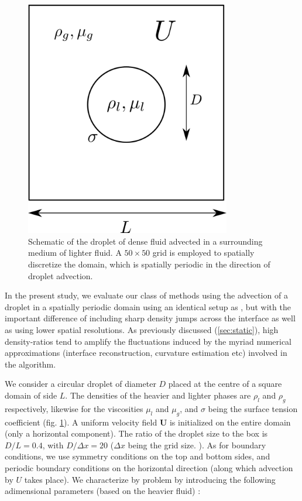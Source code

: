 \begin{figure}[h!]
    \centering
    \includegraphics[width = 0.8\textwidth]{plots/droplet_advect/config.png}
    \caption{Schematic of the droplet of dense fluid advected in a surrounding medium of lighter fluid. A $50 \times 50$ grid is employed to spatially discretize the domain, which is spatially periodic in the direction of droplet advection.}
    \label{moving_conf}
\end{figure}

In the present study, we evaluate our class of methods using the advection of a droplet in a spatially periodic domain using an identical setup as \cite{popinet2009accurate}, but with the important difference of including sharp density jumps across the interface as well as using lower spatial resolutions. As previously discussed (\ref{sec:static}), high density-ratios tend to amplify the fluctuations induced by the myriad numerical approximations (interface reconstruction, curvature estimation etc) involved in the algorithm.

We consider a circular droplet of diameter $D$ placed at the centre of a square domain of side $L$. The densities of the heavier and lighter phases are $\rho_l$ and $\rho_g$ respectively, likewise for the viscosities $\mu_l$ and $\mu_g$, and $\sigma$ being the surface tension coefficient (fig. \ref{moving_conf}). A uniform velocity field $\boldsymbol{U}$ is initialized on the entire domain (only a horizontal component). The ratio of the droplet size to the box is $D/L = 0.4$, with $D/\Delta x= 20$ ($\Delta x$ being the grid size.  ). As for boundary conditions, we use symmetry conditions on the top and bottom sides, and periodic boundary conditions on the horizontal direction (along which advection by $U$ takes place). We characterize by problem by introducing the following adimensional parameters (based on the heavier fluid) :

